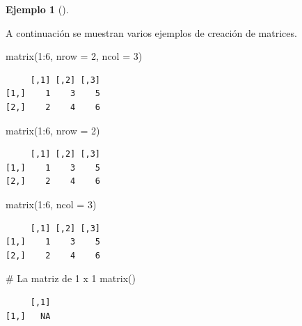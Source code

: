 \documentclass[
  a4paper,
]{scrreport}
\newenvironment{Shaded}{\begin{snugshade}}{\end{snugshade}}
\newcommand{\AttributeTok}[1]{\textcolor[rgb]{0.40,0.45,0.13}{#1}}
\newcommand{\CommentTok}[1]{\textcolor[rgb]{0.37,0.37,0.37}{#1}}
\newcommand{\DecValTok}[1]{\textcolor[rgb]{0.68,0.00,0.00}{#1}}
\newcommand{\FunctionTok}[1]{\textcolor[rgb]{0.28,0.35,0.67}{#1}}
\newcommand{\NormalTok}[1]{\textcolor[rgb]{0.00,0.23,0.31}{#1}}
\newcommand{\SpecialCharTok}[1]{\textcolor[rgb]{0.37,0.37,0.37}{#1}}
\theoremstyle{definition}
\newtheorem{example}{Ejemplo}[chapter]
\theoremstyle{definition}
\theoremstyle{remark}
\begin{document}
\leavevmode{}%
\begin{example}[]\label{exm-creacion-matrices}

A continuación se muestran varios ejemplos de creación de matrices.

\begin{Shaded}
\begin{Highlighting}[]
\FunctionTok{matrix}\NormalTok{(}\DecValTok{1}\SpecialCharTok{:}\DecValTok{6}\NormalTok{, }\AttributeTok{nrow =} \DecValTok{2}\NormalTok{, }\AttributeTok{ncol =} \DecValTok{3}\NormalTok{)}
\end{Highlighting}
\end{Shaded}

\begin{verbatim}
     [,1] [,2] [,3]
[1,]    1    3    5
[2,]    2    4    6
\end{verbatim}

\begin{Shaded}
\begin{Highlighting}[]
\FunctionTok{matrix}\NormalTok{(}\DecValTok{1}\SpecialCharTok{:}\DecValTok{6}\NormalTok{, }\AttributeTok{nrow =} \DecValTok{2}\NormalTok{)}
\end{Highlighting}
\end{Shaded}

\begin{verbatim}
     [,1] [,2] [,3]
[1,]    1    3    5
[2,]    2    4    6
\end{verbatim}

\begin{Shaded}
\begin{Highlighting}[]
\FunctionTok{matrix}\NormalTok{(}\DecValTok{1}\SpecialCharTok{:}\DecValTok{6}\NormalTok{, }\AttributeTok{ncol =} \DecValTok{3}\NormalTok{)}
\end{Highlighting}
\end{Shaded}

\begin{verbatim}
     [,1] [,2] [,3]
[1,]    1    3    5
[2,]    2    4    6
\end{verbatim}

\begin{Shaded}
\begin{Highlighting}[]
\CommentTok{\# La matriz de 1 x 1 }
\FunctionTok{matrix}\NormalTok{()}
\end{Highlighting}
\end{Shaded}

\begin{verbatim}
     [,1]
[1,]   NA
\end{verbatim}

\end{example}
\end{document}
